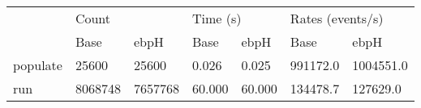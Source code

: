 \begin{tabular}{>{\ttfamily}lllllll}
\toprule
\multicolumn{1}{l}{Operation} & \multicolumn{2}{l}{Count} & \multicolumn{2}{l}{Time (s)} & \multicolumn{2}{l}{Rates (events/s)} \\
                              &     Base &     ebpH &     Base &    ebpH &             Base &       ebpH \\
\midrule
                     populate &    25600 &    25600 &    0.026 &   0.025 &         991172.0 &  1004551.0 \\
                          run &  8068748 &  7657768 &   60.000 &  60.000 &         134478.7 &   127629.0 \\
\bottomrule
\end{tabular}
